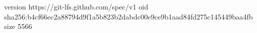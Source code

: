 version https://git-lfs.github.com/spec/v1
oid sha256:b4cf66ec2a88794d9f1a5b823b2dabdc00e9ce9b1aad84fd275c145449baa4fb
size 5566

